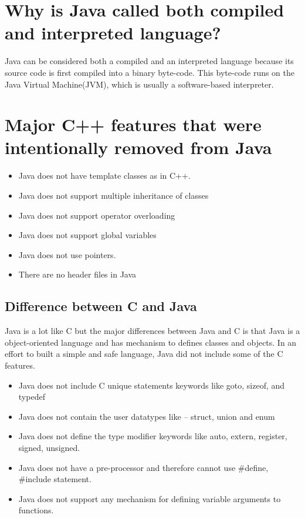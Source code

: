 \documentclass[twocolumn, a4paper]{article}
\begin{document}
\section{Why is Java called both compiled and interpreted language?}
Java can be considered both a compiled and an interpreted language because its
source code is first compiled into a binary byte-code. This byte-code runs on
the Java Virtual Machine(JVM), which is usually a software-based interpreter.

\section{Major C++ features that were intentionally removed from Java}
\begin{itemize}
  \item Java does not have template classes as in C++.
  \item Java does not support multiple inheritance of classes
  \item Java does not support operator overloading
  \item Java does not support global variables
  \item Java does not use pointers.
  \item There are no header files in Java
\end{itemize}

\subsection{Difference between C and Java}
Java is a lot like C but the major differences between Java and C is that Java
is a object-oriented language and has mechanism to defines classes and
objects. In an effort to built a simple and safe language, Java did not
include some of the C features.

\begin{itemize}
  \item Java does not include C unique statements keywords like goto, sizeof,
    and typedef
  \item Java does not contain the user datatypes like -- struct, union and
    enum
  \item Java does not define the type modifier keywords like auto, extern,
    register, signed, unsigned.
  \item Java does not have a pre-processor and therefore cannot use \#define,
    \#include statement.
  \item Java does not support any mechanism for defining variable arguments to
    functions.
\end{itemize}
\end{document}
